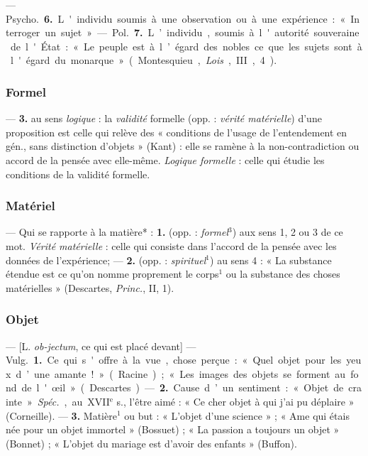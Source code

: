 — \si{Psycho.} {\bf 6.} L'individu soumis
à une observation ou à une expérience : « Interroger un sujet. »

— \si{Pol.} {\bf 7.} L’individu, soumis à l'autorité souveraine de l'État :
« Le peuple est à l’égard des nobles ce que les sujets sont à l'égard du
monarque » (Montesquieu, {\it Lois}, III, 4).


\subsubsection{Formel}
 — {\bf 3.} au sens {\it logique} : la {\it validité} formelle
(opp. : {\it vérité matérielle}) d’une proposition est celle qui relève des
« conditions de l’usage de l’entendement en gén., sans distinction
d'objets » (Kant) : elle se ramène à la non-contradiction ou accord de la
pensée avec elle-même. {\it Logique formelle} : celle qui étudie les
conditions de la validité formelle.

\subsubsection{Matériel}
 — Qui se rapporte à la matière* : {\bf 1.} (opp. :
{\it formel}$^3$) aux sens 1, 2 ou 3 de ce mot. {\it Vérité matérielle} :
celle qui consiste dans l’accord de la pensée avec les données de
l’expérience; — {\bf 2.} (opp. : {\it spirituel}$^1$) au sens 4 : « La
substance étendue est ce qu’on nomme proprement le corps$^1$ ou la substance
des choses matérielles » (Descartes, {\it Princ.}, II, 1).

\subsubsection{Objet}
 — [L. {\it ob-jectum}, ce qui est placé devant] — \si{Vulg.}
{\bf 1.} Ce qui s'offre à la vue, chose perçue : « Quel objet pour les yeux
d’une amante ! » (Racine) ; « Les images des objets se forment au fond de
l'œil » (Descartes). — {\bf 2.} Cause d’un sentiment : « Objet de crainte ».
{\it Spéc.}, au {\footnotesize XVII}$^\text{e}$ s., l'être aimé : « Ce cher
objet à qui j'ai pu déplaire » (Corneille). —  {\bf 3.} Matière$^1$ ou but :
« L'objet d’une science » ; « Ame qui étais née pour un objet
immortel » (Bossuet) ; « La passion a toujours un objet » (Bonnet) ;
« L'objet du mariage est d’avoir des enfants » (Buffon).

